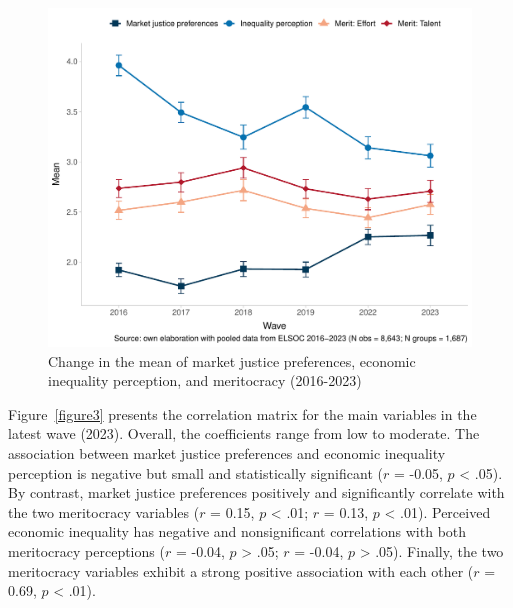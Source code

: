 \documentclass[
  12pt,
]{article}
\begin{document}
\begin{figure}[H]

{\centering \includegraphics[width=1\textwidth,height=\textheight]{figure2.pdf}

}

\caption{\label{figure2}Change in the mean of market justice
preferences, economic inequality perception, and meritocracy
(2016-2023)}

\end{figure}

Figure~\ref{figure3} presents the correlation matrix for the main
variables in the latest wave (2023). Overall, the coefficients range
from low to moderate. The association between market justice preferences
and economic inequality perception is negative but small and
statistically significant (\(r\) = -0.05, \(p\) \textless{} .05). By
contrast, market justice preferences positively and significantly
correlate with the two meritocracy variables (\(r\) = 0.15, \(p\)
\textless{} .01; \(r\) = 0.13, \(p\) \textless{} .01). Perceived
economic inequality has negative and nonsignificant correlations with
both meritocracy perceptions (\(r\) = -0.04, \(p\) \textgreater{} .05;
\(r\) = -0.04, \(p\) \textgreater{} .05). Finally, the two meritocracy
variables exhibit a strong positive association with each other (\(r\) =
0.69, \(p\) \textless{} .01).
\end{document}
